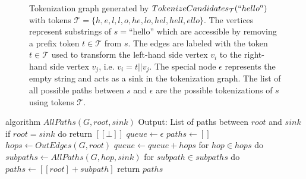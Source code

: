 \begin{figure}[htbp]
	\centering
	\caption{
Tokenization graph generated by $TokenizeCandidates_{\mathcal{T}}(``hello'')$ with tokens $\mathcal{T} = \{ h, e, l, l, o, he, lo,  hel, hell, ello \}$.
The vertices represent substrings of $s = $``hello'' which are accessible by removing a prefix token $t \in \mathcal{T}$ from $s$.
The edges are labeled with the token $t \in \mathcal{T}$ used to transform the left-hand side vertex $v_i$ to the right-hand side vertex $v_j$, i.e. $v_i = t || v_j$.
The special node $\epsilon$ represents the empty string and acts as a sink in the tokenization graph.
The list of all possible paths between $s$ and $\epsilon$ are the possible tokenizations of $s$ using tokens $\mathcal{T}$.
}
	\label{fig:ex-graph-tokenize-candidates}
\end{figure}

\begin{Pseudocode}[float,caption={DFS-based algorithm which generates a list of all possible paths between between two nodes in a DAG},label={alg:all-paths}]
algorithm $AllPaths(G, root, sink)	$
	Output: List of paths between $root$ and $sink$
	if $root = sink$ do
		return $[[\bot]]$
	$queue \leftarrow \epsilon$
	$paths \leftarrow []$
	$hops \leftarrow OutEdges(G, root)$
	$queue \leftarrow queue + hops$
	for $hop \in hops$ do
		$subpaths \leftarrow AllPaths(G, hop, sink)$
		for $subpath \in subpaths$ do
			$paths \leftarrow [[root] + subpath]$
	return $paths$
\end{Pseudocode}
